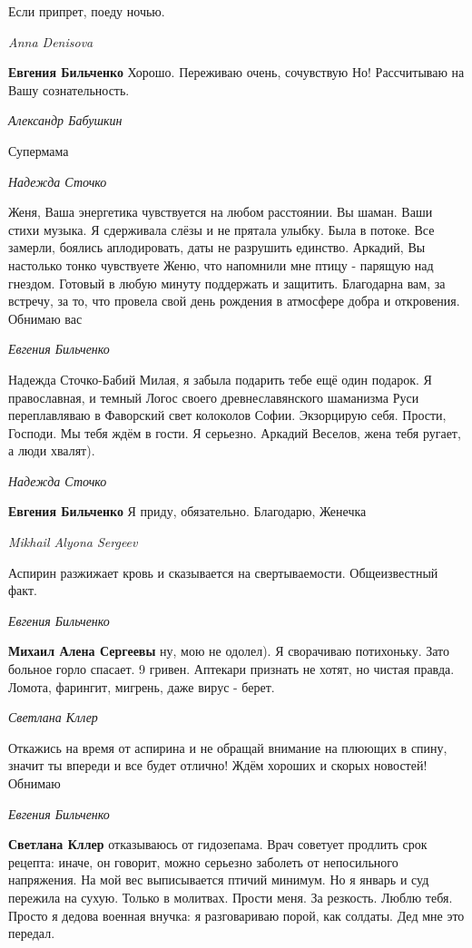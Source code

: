 Если припрет, поеду ночью.

\emph{Anna Denisova}

\textbf{Евгения Бильченко} Хорошо. Переживаю очень, сочувствую Но! Рассчитываю
на Вашу сознательность.

\emph{Александр Бабушкин}

Супермама

\emph{Надежда Сточко}

Женя, Ваша энергетика чувствуется на любом расстоянии.  Вы шаман. Ваши стихи
музыка. Я сдерживала слёзы и не прятала улыбку. Была в потоке. Все замерли,
боялись аплодировать, даты не разрушить единство. Аркадий, Вы настолько тонко
чувствуете Женю, что напомнили мне птицу - парящую над гнездом. Готовый в любую
минуту поддержать и защитить. Благодарна вам, за встречу, за то, что провела
свой день рождения в атмосфере добра и откровения. Обнимаю вас

\emph{Евгения Бильченко}

Надежда Сточко-Бабий Милая, я забыла подарить тебе ещё один подарок. Я
православная, и темный Логос своего древнеславянского шаманизма Руси
переплавляваю в Фаворский свет колоколов Софии. Экзорцирую себя. Прости,
Господи. Мы тебя ждём в гости. Я серьезно. Аркадий Веселов, жена тебя ругает,
а люди хвалят).

\emph{Надежда Сточко}

\textbf{Евгения Бильченко} Я приду, обязательно. Благодарю, Женечка

\emph{Mikhail Alyona Sergeev}

Аспирин разжижает кровь и сказывается на свертываемости. Общеизвестный факт.

\emph{Евгения Бильченко}

\textbf{Михаил Алена Сергеевы} ну, мою не одолел). Я сворачиваю потихоньку. Зато больное
горло спасает. 9 гривен. Аптекари признать не хотят, но чистая правда. Ломота,
фарингит, мигрень, даже вирус - берет.

\emph{Светлана Кллер}

Откажись на время от аспирина и не обращай внимание на плюющих в спину, значит
ты впереди и все будет отлично! Ждём хороших и скорых новостей! Обнимаю

\emph{Евгения Бильченко}

\textbf{Светлана Кллер} отказываюсь от гидозепама. Врач советует продлить срок
рецепта: иначе, он говорит, можно серьезно заболеть от непосильного напряжения.
На мой вес выписывается птичий минимум. Но я январь и суд пережила на сухую.
Только в молитвах. Прости меня. За резкость. Люблю тебя. Просто я дедова
военная внучка: я разговариваю порой, как солдаты. Дед мне это передал.

